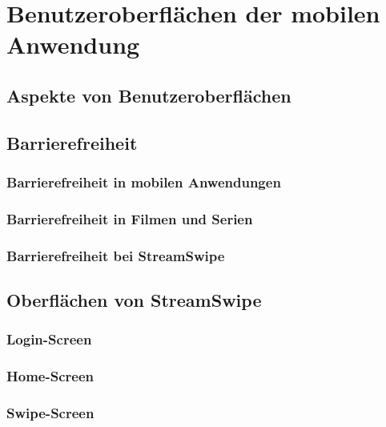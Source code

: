 \documentclass[11pt,a4paper]{article}
\begin{document}
\clearpage
\section{Benutzeroberflächen der mobilen Anwendung}
\label{sec:UI-allgemein}

\subsection{Aspekte von Benutzeroberflächen}
\label{sec:UI-Aspekte}

\subsection{Barrierefreiheit}
\label{sec:barrierefreiheit}

\subsubsection{Barrierefreiheit in mobilen Anwendungen}

\subsubsection{Barrierefreiheit in Filmen und Serien}

\subsubsection{Barrierefreiheit bei StreamSwipe}
\label{sec:bf-streamswipe}

\subsection{Oberflächen von StreamSwipe}
\label{sec:UI-alle}

\subsubsection{Login-Screen}
\label{sec:loginscreen}

\subsubsection{Home-Screen}
\label{sec:homescreen}

\subsubsection{Swipe-Screen}
\label{sec:swipescreen}

\end{document}
